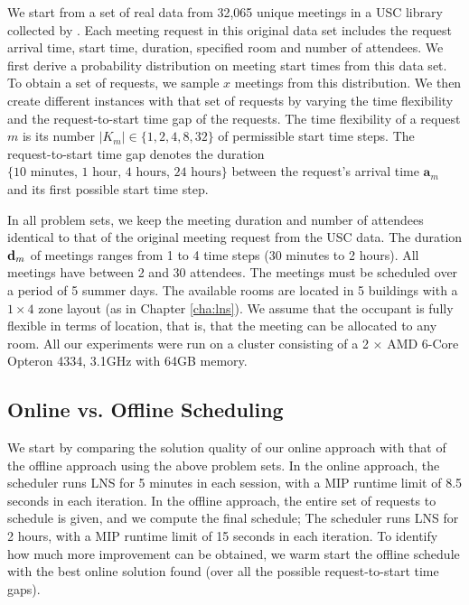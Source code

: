 We start from a set of real data from 32,065 unique meetings in a USC library collected by \cite{kwak2013tesla}. Each meeting request in this original data set includes the request arrival time, start time, duration, specified room and number of attendees. We first derive a probability distribution on meeting start times from this data set. To obtain a set of requests, we sample $x$ meetings from this distribution. We then create different instances with that set of requests by varying the time flexibility and the request-to-start time gap of the requests. The time flexibility of a request $m$ is its number $|K_m|\in \{1,2,4,8,32\}$ of permissible start time steps. The request-to-start time gap denotes the duration $\{\mbox{10 minutes, 1 hour, 4 hours, 24 hours}\}$ between the request's arrival time ${\bm a}_m$ and its first possible start time step. 

In all problem sets, we keep the meeting duration and number of attendees identical to that of the original meeting request from the USC data. The duration ${\bf d}_m$ of meetings ranges from 1 to 4 time steps (30 minutes to 2 hours). All meetings have between 2 and 30 attendees. The meetings must be scheduled over a period of 5 summer days. The available rooms are located in 5 buildings with a $1\times4$ zone layout (as in Chapter \ref{cha:lns}). We assume that the occupant is fully flexible in terms of location, that is, that the meeting can be allocated to any room. 
All our experiments were run on a cluster consisting of a 2 $\times$ AMD 6-Core Opteron 4334, 3.1GHz with 64GB memory. 


\subsection{Online vs. Offline Scheduling}

We start by comparing the solution quality of our online approach with that of the offline approach using the above problem sets.
In the online approach, the scheduler runs LNS for 5 minutes in each session, with a MIP runtime limit of 8.5 seconds in each iteration. In the offline approach, the entire set of requests to schedule is given, and we compute the final schedule; The scheduler runs LNS for 2 hours, with a MIP runtime limit of 15 seconds in each iteration. To identify how much more improvement can be obtained, we warm start the offline schedule with the best online solution found (over all the possible request-to-start time gaps).

